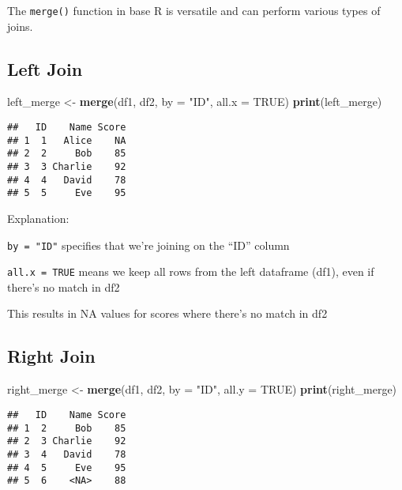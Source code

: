 \documentclass[
]{article}
\newenvironment{Shaded}{\begin{snugshade}}{\end{snugshade}}
\newcommand{\AttributeTok}[1]{\textcolor[rgb]{0.13,0.29,0.53}{#1}}
\newcommand{\ConstantTok}[1]{\textcolor[rgb]{0.56,0.35,0.01}{#1}}
\newcommand{\FunctionTok}[1]{\textcolor[rgb]{0.13,0.29,0.53}{\textbf{#1}}}
\newcommand{\NormalTok}[1]{#1}
\newcommand{\OtherTok}[1]{\textcolor[rgb]{0.56,0.35,0.01}{#1}}
\newcommand{\StringTok}[1]{\textcolor[rgb]{0.31,0.60,0.02}{#1}}
\begin{document}
The \texttt{merge()} function in base R is versatile and can perform
various types of joins.

\hypertarget{left-join}{%
\subsection{Left Join}\label{left-join}}

\begin{Shaded}
\begin{Highlighting}[]
\NormalTok{left\_merge }\OtherTok{\textless{}{-}} \FunctionTok{merge}\NormalTok{(df1, df2, }\AttributeTok{by =} \StringTok{"ID"}\NormalTok{, }\AttributeTok{all.x =} \ConstantTok{TRUE}\NormalTok{)}
\FunctionTok{print}\NormalTok{(left\_merge)}
\end{Highlighting}
\end{Shaded}

\begin{verbatim}
##   ID    Name Score
## 1  1   Alice    NA
## 2  2     Bob    85
## 3  3 Charlie    92
## 4  4   David    78
## 5  5     Eve    95
\end{verbatim}

Explanation:

\texttt{by\ =\ "ID"} specifies that we're joining on the ``ID'' column

\texttt{all.x\ =\ TRUE} means we keep all rows from the left dataframe
(df1), even if there's no match in df2

This results in NA values for scores where there's no match in df2

\hypertarget{right-join}{%
\subsection{Right Join}\label{right-join}}

\begin{Shaded}
\begin{Highlighting}[]
\NormalTok{right\_merge }\OtherTok{\textless{}{-}} \FunctionTok{merge}\NormalTok{(df1, df2, }\AttributeTok{by =} \StringTok{"ID"}\NormalTok{, }\AttributeTok{all.y =} \ConstantTok{TRUE}\NormalTok{)}
\FunctionTok{print}\NormalTok{(right\_merge)}
\end{Highlighting}
\end{Shaded}

\begin{verbatim}
##   ID    Name Score
## 1  2     Bob    85
## 2  3 Charlie    92
## 3  4   David    78
## 4  5     Eve    95
## 5  6    <NA>    88
\end{verbatim}
\end{document}

